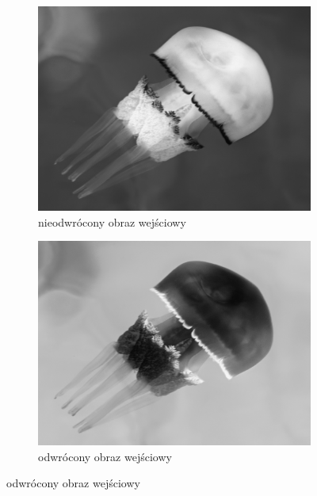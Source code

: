        \begin{figure}[htb] 
        \centering
        \begin{subfigure}{0.31\textwidth}
            \centering
            \includegraphics[width = \textwidth]{img/2-theory/10-jellyfish.png}
            \caption{nieodwrócony obraz wejściowy\\\hphantom{ }}
            \label{theory-technics-contrast-jellyfish-a}
        \end{subfigure}
        \begin{subfigure}{0.31\textwidth}
            \centering
            \includegraphics[width = \textwidth]{img/2-theory/10-inv-jellyfish.png}
            \caption{odwrócony obraz wejściowy\\\hphantom{ }}

\end{subfigure}
\end{figure}

